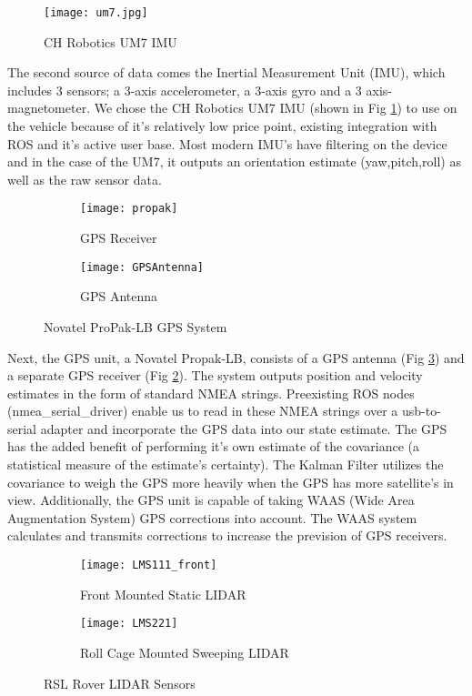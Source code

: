 \begin{figure}[H]
	\centerline{\texttt{[image: um7.jpg]}}
	\caption[]{CH Robotics UM7 IMU}
	\label{fig:imu}
\end{figure}

The second source of data comes the Inertial Measurement Unit (IMU), which includes 3 sensors; a 3-axis accelerometer, a 3-axis gyro and a 3 axis-magnetometer. We chose the CH Robotics UM7 IMU (shown in Fig \ref{fig:imu}) to use on the vehicle because of it's relatively low price point, existing integration with ROS and it's active user base. Most modern IMU's have filtering on the device and in the case of the UM7, it outputs an orientation estimate (yaw,pitch,roll) as well as the raw sensor data. 

\begin{figure}[H]
\centering
\begin{subfigure}{.5\textwidth}
	\centering
	\texttt{[image: propak]}
	\caption{GPS Receiver}
	\label{fig:gpsrec}
\end{subfigure}%
\begin{subfigure}{.5\textwidth}
	\centering
	\texttt{[image: GPSAntenna]}
	\caption{GPS Antenna}
	\label{fig:gpsant}
\end{subfigure}
\caption{Novatel ProPak-LB GPS System}
\label{fig:gps}
\end{figure}

Next, the GPS unit, a Novatel Propak-LB, consists of a GPS antenna (Fig \ref{fig:gpsant}) and a separate GPS receiver (Fig \ref{fig:gpsrec}). The system outputs position and velocity estimates in the form of standard NMEA strings. Preexisting ROS nodes (nmea\_serial\_driver) enable us to read in these NMEA strings over a usb-to-serial adapter and incorporate the GPS data into our state estimate. The GPS has the added benefit of performing it's own estimate of the covariance (a statistical measure of the estimate's certainty). The Kalman Filter utilizes the covariance to weigh the GPS more heavily when the GPS has more satellite's in view. Additionally, the GPS unit is capable of taking WAAS (Wide Area Augmentation System) GPS corrections into account. The WAAS system calculates and transmits corrections to increase the prevision of GPS receivers.

\begin{figure}[H]
	\centering
	\begin{subfigure}{.5\textwidth}
		\centering
		\texttt{[image: LMS111\_front]}
		\caption{Front Mounted Static LIDAR}
		\label{fig:lidar_front}
	\end{subfigure}%
	\begin{subfigure}{.5\textwidth}
		\centering
		\texttt{[image: LMS221]}
		\caption{Roll Cage Mounted Sweeping LIDAR}
		\label{fig:lidar_scanning}
	\end{subfigure}
	\caption{RSL Rover LIDAR Sensors}
	\label{fig:lidar}
\end{figure}

